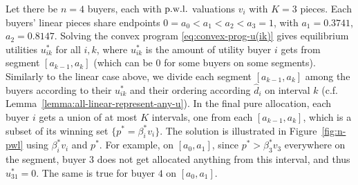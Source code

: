 \begin{example}
	\normalfont 
	Let there be $n=4$ buyers, each with ${\rm p.w.l.}$ valuations $v_i$ with $K = 3$ pieces. Each buyers' linear pieces share endpoints $0 = a_0 < a_1 < a_2 < a_3 = 1$, with $a_1 = 0.3741$, $a_2 = 0.8147$. 
	Solving the convex program \eqref{eq:convex-prog-u(ik)} gives equilibrium utilities $u^*_{ik}$ for all $i,k$, where $u^*_{ik}$ is the amount of utility buyer $i$ gets from segment $[a_{k-1}, a_k]$ (which can be $0$ for some buyers on some segments). 
	Similarly to the linear case above, we divide each segment  $[a_{k-1}, a_k]$ among the buyers according to their $u^*_{ik}$ and their ordering according $\hat{d}_i$  on interval $k$ (c.f. Lemma~\ref{lemma:all-linear-represent-any-u}).
	In the final pure allocation, each buyer $i$ gets a union of at most $K$ intervals, one from each $[a_{k-1}, a_k]$, which is a subset of its winning set $\{p^* = \beta^*_i v_i\}$. 
	The solution is illustrated in Figure~\ref{fig:n-pwl} using $\beta^*_i v_i$ and $p^*$.
	For example, on $[a_0, a_1]$, since $p^* > \beta^*_3 v_3$ everywhere on the segment, buyer $3$ does not get allocated anything from this interval, and thus $u^*_{31} = 0$. The same is true for buyer $4$ on $[a_0, a_1]$. 
	\label{ex:pwl-numerical}
\end{example}


